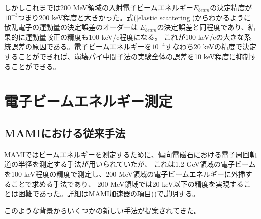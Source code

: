 \documentclass[a4paper,11pt,uplatex]{jsbook}
\begin{document}
しかしこれまでは200 MeV領域の入射電子ビームエネルギー$E_{beam}$の決定精度が$10^{-3}$つまり200 keV程度と大きかった。式(\ref{elastic scattering})からわかるように散乱電子の運動量の決定誤差のオーダーは
$E_{beam}$の決定誤差と同程度であり、結果的に運動量較正の精度も100 keV/c程度になる。
これが100 keV/cの大きな系統誤差の原因である。電子ビームエネルギーを$10^{-4}$すなわち$20$ keVの精度で決定することができれば、崩壊パイ中間子法の実験全体の誤差を10 keV程度に抑制することができる。

\section{電子ビームエネルギー測定}
\subsection{MAMIにおける従来手法}
MAMIではビームエネルギーを測定するために、偏向電磁石における電子周回軌道の半径を測定する手法が用いられていたが、
これは1.2 GeV領域の電子ビームを100 keV程度の精度で測定し、200 MeV領域の電子ビームエネルギーに外挿することで求める手法であり、
200 MeV領域では20 keV以下の精度を実現することは困難であった。詳細はMAMI加速器の項目(\label{sec:MAMI})で説明する。

このような背景からいくつかの新しい手法が提案されてきた。
\end{document}
